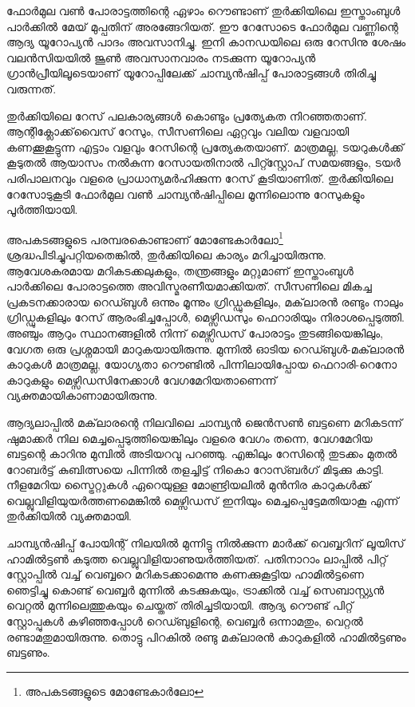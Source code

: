 \vskip 2pt

ഫോര്‍മുല വണ്‍ പോരാട്ടത്തിന്റെ ഏഴാം റൌണ്ടാണ് തുര്‍ക്കിയിലെ ഇസ്താംബുള്‍ പാര്‍ക്കില്‍ മേയ് മുപ്പതിന് 
അരങ്ങേറിയത്. ഈ റേസോടെ ഫോര്‍മുല വണ്ണിന്റെ ആദ്യ യൂറോപ്യന്‍ പാദം അവസാനിച്ചു. ഇനി കാനഡയിലെ 
ഒരു റേസിനു ശേഷം വലന്‍സിയയില്‍ ജൂണ്‍ അവസാനവാരം നടക്കുന്ന യൂറോപ്യന്‍ ഗ്രാന്‍പ്രീയിലൂടെയാണ് 
യൂറോപ്പിലേക്ക് ചാമ്പ്യന്‍ഷിപ്പ് പോരാട്ടങ്ങള്‍ തിരിച്ചു വരുന്നത്.

തുര്‍ക്കിയിലെ റേസ് പലകാര്യങ്ങള്‍ കൊണ്ടും പ്രത്യേകത നിറഞ്ഞതാണ്. ആന്റിക്ലോക്ക്‌വൈസ് റേസും, സീസണിലെ 
ഏറ്റവും വലിയ വളവായി കണക്കൂകൂട്ടുന്ന എട്ടാം വളവും റേസിന്റെ പ്രത്യേകതയാണ്. മാത്രമല്ല, ടയറുകള്‍ക്ക് കൂടുതല്‍ 
ആയാസം നല്‍കുന്ന റേസായതിനാല്‍ പിറ്റ്സ്റ്റോപ് സമയങ്ങളും, ടയര്‍ പരിപാലനവും വളരെ പ്രാധാന്യമര്‍ഹിക്കുന്ന 
റേസ് കൂടിയാണിത്. തുര്‍ക്കിയിലെ റേസോടുകൂടി ഫോര്‍മുല വണ്‍ ചാമ്പ്യന്‍ഷിപ്പിലെ മൂന്നിലൊന്നു റേസുകളും പൂര്‍ത്തിയായി.

അപകടങ്ങളുടെ പരമ്പരകൊണ്ടാണ് മോണ്ടേകാര്‍ലോ\footnote{അപകടങ്ങളുടെ മോണ്ടേകാര്‍ലോ} ശ്രദ്ധപിടിച്ചുപറ്റിയതെങ്കില്‍, തുര്‍ക്കിയിലെ കാര്യം മറിച്ചായിരുന്നു. 
ആവേശകരമായ മറികടക്കലുകളും, തന്ത്രങ്ങളും മറ്റുമാണ് ഇസ്താംബുള്‍ പാര്‍ക്കിലെ പോരാട്ടത്തെ അവിസ്മരണീയമാക്കിയത്. 
സീസണിലെ മികച്ച പ്രകടനക്കാരായ റെഡ്ബുള്‍ ഒന്നും മൂന്നും ഗ്രിഡ്ഡുകളിലും, മക്‌ലാരന്‍ രണ്ടും നാലും ഗ്രിഡ്ഡുകളിലും റേസ് 
ആരംഭിച്ചപ്പോള്‍, മെഴ്സിഡസും ഫെറാരിയും നിരാശപ്പെടുത്തി. അഞ്ചും ആറും സ്ഥാനങ്ങളില്‍ നിന്ന് മെഴ്സിഡസ് പോരാട്ടം 
തുടങ്ങിയെങ്കിലും, വേഗത ഒരു പ്രശ്നമായി മാറുകയായിരുന്നു. മുന്നില്‍ ഓടിയ റെഡ്ബുള്‍-മക്‌ലാരന്‍ കാറുകള്‍ മാത്രമല്ല, 
യോഗ്യതാ റൌണ്ടില്‍ പിന്നിലായിപ്പോയ ഫെറാരി-റെനോ കാറുകളും മെഴ്സിഡസിനേക്കാള്‍ വേഗമേറിയതാണെന്ന് 
വ്യക്തമായികാണാമായിരുന്നു.

ആദ്യലാപ്പില്‍ മക്‌ലാരന്റെ നിലവിലെ ചാമ്പ്യന്‍ ജെന്‍സണ്‍ ബട്ടണെ മറികടന്ന് ഷുമാക്കര്‍ നില മെച്ചപ്പെടുത്തിയെങ്കിലും 
വളരെ വേഗം തന്നെ, വേഗമേറിയ ബട്ടന്റെ കാറിനു മുമ്പില്‍ അടിയറവു പറഞ്ഞു. എങ്കിലും റേസിന്റെ തുടക്കം മുതല്‍ റോബര്‍ട്ട് 
കുബിത്സയെ പിന്നില്‍ തളച്ചിട്ട് നികൊ റോസ്ബര്‍ഗ് മിടുക്കു കാട്ടി. നീളമേറിയ സ്ട്രൈറ്റുകള്‍ ഏറെയുള്ള മോണ്ട്രിയലില്‍ 
മുന്‍നിര കാറുകള്‍ക്ക് വെല്ലുവിളിയുയര്‍ത്തണമെങ്കില്‍ മെഴ്സിഡസ് ഇനിയും മെച്ചപ്പെട്ടേമതിയാകൂ എന്ന് തുര്‍ക്കിയില്‍ 
വ്യക്തമായി.

ചാമ്പ്യന്‍ഷിപ്പ് പോയിന്റ് നിലയില്‍ മുന്നിട്ടു നില്‍ക്കുന്ന മാര്‍ക്ക് വെബ്ബറിന് ലൂയിസ് ഹാമില്‍ട്ടണ്‍ കടുത്ത 
വെല്ലുവിളിയാണുയര്‍ത്തിയത്.  പതിനാറാം ലാപ്പില്‍ പിറ്റ് സ്റ്റോപ്പില്‍ വച്ച് വെബ്ബറെ മറികടക്കാമെന്നു കണക്കുകൂട്ടിയ 
ഹാമില്‍ട്ടണെ ഞെട്ടിച്ചു കൊണ്ട് വെബ്ബര്‍ മുന്നില്‍ കടക്കുകയും, ട്രാക്കില്‍ വച്ച് സെബാസ്റ്റ്യന്‍ വെറ്റല്‍ മുന്നിലെത്തുകയും 
ചെയ്തത് തിരിച്ചടിയായി. ആദ്യ റൌണ്ട് പിറ്റ് സ്റ്റോപ്പുകള്‍ കഴിഞ്ഞപ്പോള്‍ റെഡ്ബുളിന്റെ, വെബ്ബര്‍ ഒന്നാമതും, 
വെറ്റല്‍ രണ്ടാമതുമായിരുന്നു. തൊട്ടു പിറകില്‍ രണ്ടു മക്‌ലാരന്‍ കാറുകളില്‍ ഹാമില്‍ട്ടണും ബട്ടണും.

